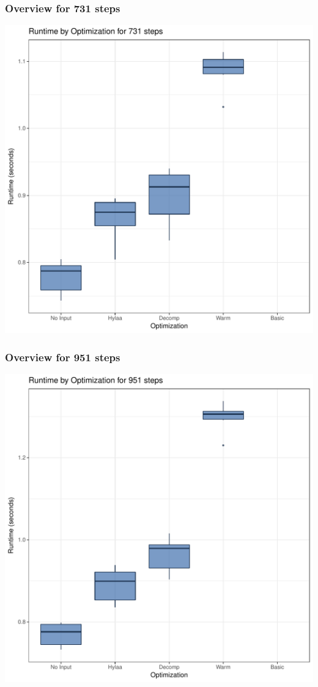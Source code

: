 \documentclass{article}\usepackage[]{graphicx}\usepackage[]{color}
\makeatletter
\def\maxwidth{ %
  \ifdim\Gin@nat@width>\linewidth
    \linewidth
  \else
    \Gin@nat@width
  \fi
}
\newenvironment{knitrout}{}{} %
\makeatother
\begin{document}
\subsubsection{Overview for 731 steps}
\begin{knitrout}
\color{fgcolor}
\includegraphics[width=\maxwidth]{figure/steps731-1} 

\end{knitrout}
\subsubsection{Overview for 951 steps}
\begin{knitrout}
\color{fgcolor}
\includegraphics[width=\maxwidth]{figure/steps951-1} 

\end{knitrout}
\end{document}
